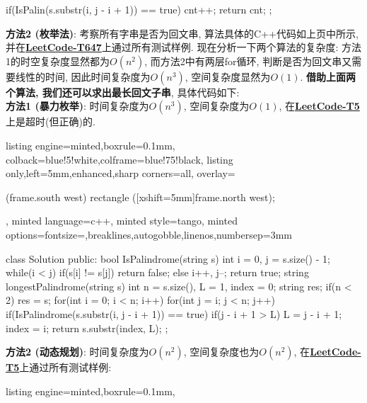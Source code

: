 \documentclass{article}
\begin{document}
\begin{homeworkProblem}
\begin{tcblisting}
{{{{                if(IsPalin(s.substr(i, j - i + 1)) == true) {
                    cnt++;
                }
            }
        }
        return cnt;
    }
};
\end{tcblisting}
    \textbf{方法2 (枚举法)}: 考察所有字串是否为回文串, 算法具体的C++代码如上页中所示, 并在\href{https://leetcode.cn/problems/palindromic-substrings/description/}{\textbf{LeetCode-T647}}上通过所有测试样例. 现在分析一下两个算法的复杂度: 方法1的时空复杂度显然都为$O(n^2)$, 而方法2中有两层for循环, 判断是否为回文串又需要线性的时间, 因此时间复杂度为$O(n^3)$, 空间复杂度显然为$O(1)$. \textbf{借助上面两个算法, 我们还可以求出最长回文子串}, 具体代码如下:
    \\

    \textbf{方法1 (暴力枚举)}: 时间复杂度为$O(n^3)$, 空间复杂度为$O(1)$, 在\href{https://leetcode.cn/problems/longest-palindromic-substring/}{\textbf{LeetCode-T5}}上是超时(但正确)的.
\begin{tcblisting}{listing engine=minted,boxrule=0.1mm,
colback=blue!5!white,colframe=blue!75!black,
listing only,left=5mm,enhanced,sharp corners=all,
overlay={\begin{tcbclipinterior} (frame.south west)
rectangle ([xshift=5mm]frame.north west);\end{tcbclipinterior}},
minted language=c++,
minted style=tango,
minted options={fontsize=\small,breaklines,autogobble,linenos,numbersep=3mm}}
class Solution {
public:
    bool IsPalindrome(string s) {
        int i = 0, j = s.size() - 1;
        while(i < j) {
            if(s[i] != s[j]) {
                return false;
            }
            else {
                i++, j--;
            }
        }
        return true;
    }
    string longestPalindrome(string s) {
        int n = s.size(), L = 1, index = 0;
        string res;
        if(n < 2) res = s;
        for(int i = 0; i < n; i++) {
            for(int j = i; j < n; j++) {
                if(IsPalindrome(s.substr(i, j - i + 1)) == true) {
                    if(j - i + 1 > L) {
                        L = j - i + 1;
                        index = i;
                    }
                }
            }
        }
        return s.substr(index, L);
    }
};
\end{tcblisting}
    \newpage
    \vspace{2cm}
    \textbf{方法2 (动态规划)}: 时间复杂度为$O(n^2)$, 空间复杂度也为$O(n^2)$, 在\href{https://leetcode.cn/problems/longest-palindromic-substring/}{\textbf{LeetCode-T5}}上通过所有测试样例:
\begin{tcblisting}{listing engine=minted,boxrule=0.1mm,
}
\end{tcblisting}
\end{homeworkProblem}
\end{document}
